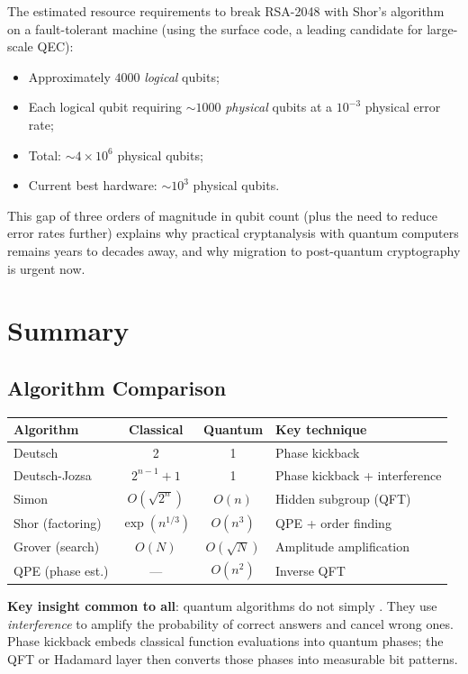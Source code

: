 \documentclass[oneside]{academica}
\begin{document}
The estimated resource requirements to break RSA-2048 with Shor's algorithm on a fault-tolerant machine (using the surface code, a leading candidate for large-scale QEC):
\begin{itemize}
  \item Approximately $4000$ \emph{logical} qubits;
  \item Each logical qubit requiring $\sim1000$ \emph{physical} qubits at a $10^{-3}$ physical error rate;
  \item Total: $\sim4\times10^6$ physical qubits;
  \item Current best hardware: $\sim10^3$ physical qubits.
\end{itemize}
This gap of three orders of magnitude in qubit count (plus the need to reduce error rates further) explains why practical cryptanalysis with quantum computers remains years to decades away, and why migration to post-quantum cryptography is urgent now.

\appendix

\chapter{Summary}

\section{Algorithm Comparison}

\begin{center}
  \renewcommand{\arraystretch}{1.5}
  \begin{tabular}{l|c|c|l}
    \textbf{Algorithm} & \textbf{Classical} & \textbf{Quantum} & \textbf{Key technique} \\
    \hline
    Deutsch & 2 & 1 & Phase kickback \\
    Deutsch-Jozsa & $2^{n-1}+1$ & 1 & Phase kickback + interference \\
    Simon & $O(\sqrt{2^n})$ & $O(n)$ & Hidden subgroup (QFT) \\
    Shor (factoring) & $\exp(n^{1/3})$ & $O(n^3)$ & QPE + order finding \\
    Grover (search) & $O(N)$ & $O(\sqrt N)$ & Amplitude amplification \\
    QPE (phase est.) & --- & $O(n^2)$ & Inverse QFT \\
  \end{tabular}
\end{center}

\textbf{Key insight common to all}: quantum algorithms do not simply .
They use \emph{interference} to amplify the probability of correct answers and cancel wrong ones.
Phase kickback embeds classical function evaluations into quantum phases; the QFT or Hadamard layer then converts those phases into measurable bit patterns.
\end{document}
